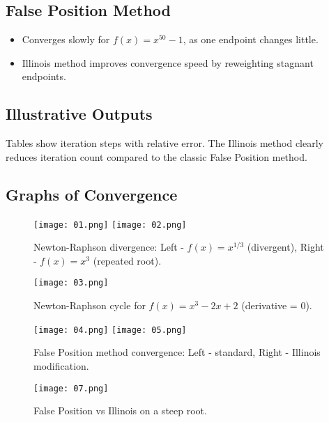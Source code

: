 \documentclass[12pt,a4paper]{article}
\begin{document}
\subsection{False Position Method}
\begin{itemize}
    \item Converges slowly for $f(x) = x^{50} - 1$, as one endpoint changes little.
    \item Illinois method improves convergence speed by reweighting stagnant endpoints.
\end{itemize}

\subsection{Illustrative Outputs}
Tables show iteration steps with relative error. The Illinois method clearly reduces iteration count compared to the classic False Position method.

\subsection{Graphs of Convergence}

\begin{figure}[H]
    \centering
    \texttt{[image: 01.png]}
    \texttt{[image: 02.png]}
    \caption{Newton-Raphson divergence: Left - $f(x) = x^{1/3}$ (divergent), Right - $f(x) = x^3$ (repeated root).}
    \label{fig:newton-divergence}
\end{figure}

\clearpage

\begin{figure}[H]
    \centering
    \texttt{[image: 03.png]}
    \caption{Newton-Raphson cycle for $f(x) = x^3-2x+2$ (derivative = 0).}
    \label{fig:newton-cycle}
\end{figure}

\clearpage

\begin{figure}[H]
    \centering
    \texttt{[image: 04.png]}
    \texttt{[image: 05.png]}
    \caption{False Position method convergence: Left - standard, Right - Illinois modification.}
    \label{fig:falseposition-convergence}
\end{figure}



\begin{figure}[H]
    \centering
    \texttt{[image: 07.png]}
    \caption{False Position vs Illinois on a steep root.} 
    \label{fig:falseposition-steep}
\end{figure}
\end{document}
